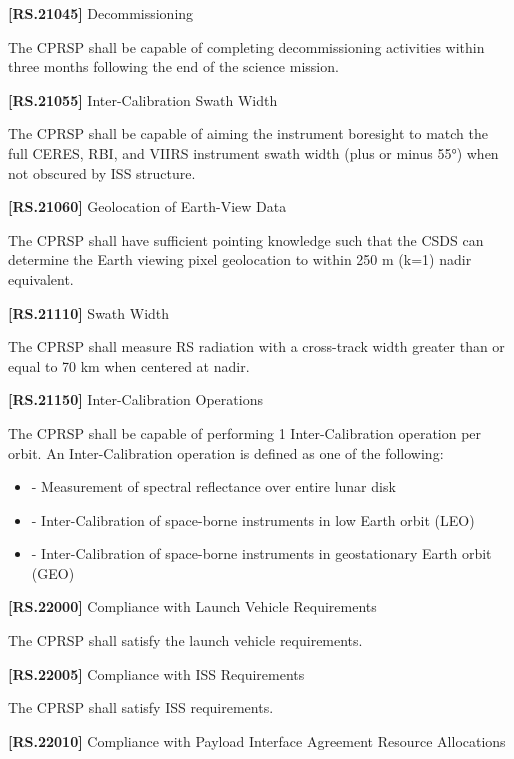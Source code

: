 \documentclass[12pt,oneside,oldfontcommands]{memoir}
\begin{document}
\textbf{[RS.21045]} Decommissioning

The \gls{CPRSP} shall be capable of completing decommissioning activities within three months following the end of the science mission.

\textbf{[RS.21055]} Inter-Calibration Swath Width

The \gls{CPRSP} shall be capable of aiming the instrument boresight to match the full \gls{CERES}, \gls{RBI}, and \gls{VIIRS} instrument swath width (plus or minus 55°) when not obscured by \gls{ISS} structure.

\textbf{[RS.21060]} Geolocation of Earth-View Data

The \gls{CPRSP} shall have sufficient \gls{point}ing knowledge such that the \gls{CSDS} can determine the Earth viewing pixel geolocation to within 250 m (k=1) nadir equivalent.

\textbf{[RS.21110]} Swath Width

The \gls{CPRSP} shall \gls{measure} \gls{RS} radiation with a cross-track width greater than or equal to 70 km when centered at nadir.

\textbf{[RS.21150]} Inter-Calibration Operations

The \gls{CPRSP} shall be capable of performing 1 Inter-Calibration operation per orbit. An Inter-Calibration operation is defined as one of the following:

\begin{itemize}
\item{} - Measurement of spectral reflectance over entire lunar disk

\item{} - Inter-Calibration of space-borne instruments in low Earth orbit (LEO)

\item{} - Inter-Calibration of space-borne instruments in geostationary Earth orbit (GEO)

\end{itemize}

\textbf{[RS.22000]} Compliance with Launch Vehicle Requirements

The \gls{CPRSP} shall satisfy the launch vehicle requirements.

\textbf{[RS.22005]} Compliance with \gls{ISS} Requirements

The \gls{CPRSP} shall satisfy \gls{ISS} requirements.

\textbf{[RS.22010]} Compliance with Payload Interface Agreement Resource Allocations
\end{document}
